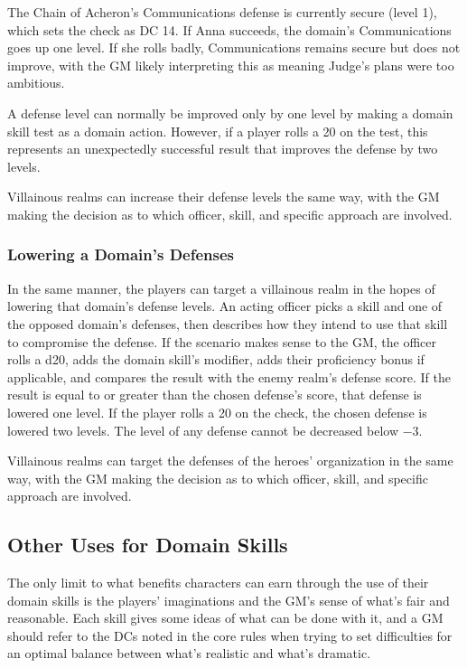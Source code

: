 \documentclass[10pt,a4paper,twoside,bg=print,twocolumn,openany,nodeprecatedcode]{dndbook}
\begin{document}
The Chain of Acheron's Communications defense is currently secure (level 1), which sets the check as DC 14. If Anna succeeds, the domain's Communications goes up one level. If she rolls badly, Communications remains secure but does not improve, with the GM likely interpreting this as meaning Judge's plans were too ambitious.

A defense level can normally be improved only by one level by making a domain skill test as a domain action. However, if a player rolls a 20 on the test, this represents an unexpectedly successful result that improves the defense by two levels.

Villainous realms can increase their defense levels the same way, with the GM making the decision as to which officer, skill, and specific approach are involved.

\subsubsection{Lowering a Domain's Defenses}
In the same manner, the players can target a villainous realm in the hopes of lowering that domain's defense levels. An acting officer picks a skill and one of the opposed domain's defenses, then describes how they intend to use that skill to compromise the defense. If the scenario makes sense to the GM, the officer rolls a d20, adds the domain skill's modifier, adds their proficiency bonus if applicable, and compares the result with the enemy realm's defense score. If the result is equal to or greater than the chosen defense's score, that defense is lowered one level. If the player rolls a 20 on the check, the chosen defense is lowered two levels. The level of any defense cannot be decreased below −3.

Villainous realms can target the defenses of the heroes' organization in the same way, with the GM making the decision as to which officer, skill, and specific approach are involved.

\subsection{Other Uses for Domain Skills}
The only limit to what benefits characters can earn through the use of their domain skills is the players' imaginations and the GM's sense of what's fair and reasonable. Each skill gives some ideas of what can be done with it, and a GM should refer to the DCs noted in the core rules when trying to set difficulties for an optimal balance between what's realistic and what's dramatic.
\end{document}

